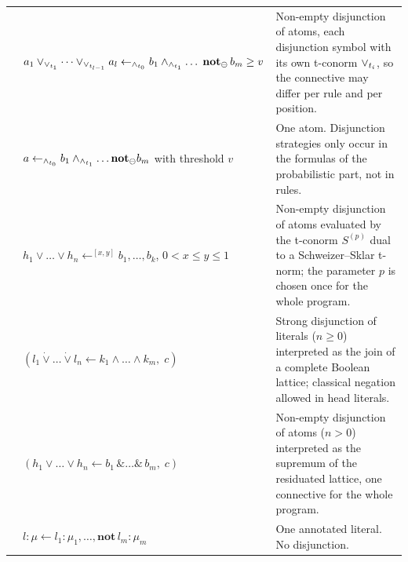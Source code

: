 {\begin{longtable}{@{}p{}p{}p{}@{}}
            \cite{LukasiewiczS07}                 & $a_1\lor_{\lor_{t_{1}}}\dots\lor_{\lor_{t_{l-1}}}a_l\leftarrow_{\land_{t_{0}}}b_1\land_{\land_{t_{1}}}\dots\;\mathbf{not}_{\ominus}\,b_m\geq v$ & Non-empty disjunction of atoms, each disjunction symbol with its own t-conorm $\lor_{t_{i}}$, so the connective may differ per rule and per position.                                                                             \\
            \cite{LukasiewiczS09}                 & $a\leftarrow_{\land_{t_{0}}}b_1\land_{\land_{t_{1}}}\dots\mathbf{not}_\ominus b_m$ with threshold $v$                                               & One atom. Disjunction strategies only occur in the formulas of the probabilistic part, not in rules.                                                                                                                                \\
            \cite{Mateis00}                       & $h_1\lor\dots\lor h_n\leftarrow^{[x,y]}b_1,\dots,b_k$, $0<x\leq y\leq1$                                                                                 & Non-empty disjunction of atoms evaluated by the t-conorm $S^{(p)}$ dual to a Schweizer--Sklar t-norm; the parameter $p$ is chosen once for the whole program.                                                                       \\
            \cite{Guller02}                       & $(l_1\mathbin{\dot\lor}\dots\mathbin{\dot\lor}l_n\leftarrow k_1\land\dots\land k_m,\;c)$                                                                & Strong disjunction of literals ($n\geq0$) interpreted as the join of a complete Boolean lattice; classical negation allowed in head literals.                                                                                       \\
            \cite{Guller2004procedural}           & $(h_1\lor\dots\lor h_n\leftarrow b_1\,\&\dots\&\,b_m,\;c)$                                                                                              & Non-empty disjunction of atoms ($n>0$) interpreted as the supremum of the residuated lattice, one connective for the whole program.                                                                                                 \\
            \cite{Saad2009extended}               & $l:\mu\leftarrow l_1:\mu_1,\dots,\mathbf{not}\,l_m:\mu_m$                                                                                               & One annotated literal. No disjunction.                                                                                                                                                                                              \\

\end{longtable}}
